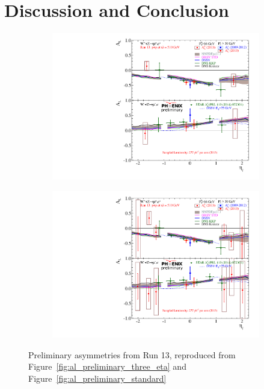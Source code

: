 \chapter{Discussion and Conclusion}
\label{ch:conclusion}

\begin{figure}[ht]
	\centering
	\begin{subfigure}[t]{0.5\textwidth}
		\centering
		\includegraphics[width=0.95\linewidth]{./figures/prelim_AL_2bins.pdf}
	\end{subfigure}%
	\begin{subfigure}[t]{0.5\textwidth}
		\centering
		\includegraphics[width=0.95\linewidth]{./figures/prelim_AL_6bins.pdf}
	\end{subfigure}
	\caption{
		Preliminary asymmetries from Run 13, reproduced from
		Figure~\ref{fig:al_preliminary_three_eta} and
		Figure~\ref{fig:al_preliminary_standard}
	}
	\label{fig:asymmetries_preliminary}
\end{figure}

